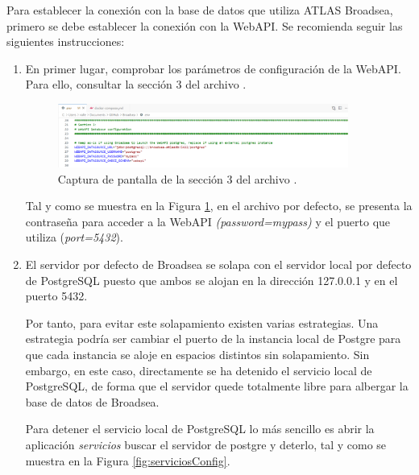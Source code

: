 Para establecer la conexión con la base de datos que utiliza ATLAS Broadsea, primero se debe establecer la conexión con la WebAPI. Se recomienda seguir las siguientes instrucciones:

\begin{enumerate}

    \item En primer lugar, comprobar los parámetros de configuración de la WebAPI. Para ello, consultar la sección 3 del archivo .
    
    \begin{figure}[H]
    \centering
    \includegraphics[width=0.90\textwidth]{figures/seccion3env.png}
     \caption{Captura de pantalla de la sección 3 del archivo .}
    \label{fig:seccion3env}
    \end{figure}


    Tal y como se muestra en la Figura \ref{fig:seccion3env}, en el archivo por defecto, se presenta la contraseña para acceder a la WebAPI \textit{(password=mypass)} y el puerto que utiliza (\textit{port=5432}).

    \item El servidor por defecto de Broadsea se solapa con el servidor local por defecto de PostgreSQL puesto que ambos se alojan en la dirección 127.0.0.1 y en el puerto 5432. 
    
    Por tanto, para evitar este solapamiento existen varias estrategias. Una estrategia podría ser cambiar el puerto de la instancia local de Postgre para que cada instancia se aloje en espacios distintos sin solapamiento. Sin embargo, en este caso, directamente se ha detenido el servicio local de PostgreSQL, de forma que el servidor quede totalmente libre para albergar la base de datos de Broadsea.

    Para detener el servicio local de PostgreSQL lo más sencillo es abrir la aplicación \textit{servicios} buscar el servidor de postgre y deterlo, tal y como se muestra en la Figura \ref{fig:serviciosConfig}.


\end{enumerate}
